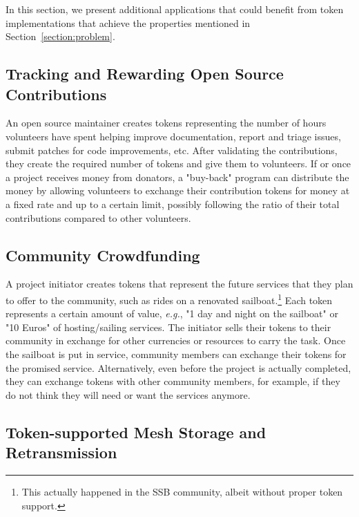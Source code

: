 \documentclass[sigconf,9pt]{acmart}
\begin{document}
In this section, we present additional applications that could benefit from token implementations that achieve the properties mentioned in Section~\ref{section:problem}.

\subsection{Tracking and Rewarding Open Source Contributions}
\label{section:tracking-oss-contributions}

An open source maintainer creates tokens representing the number of hours volunteers have spent helping improve documentation, report and triage issues, submit patches for code improvements, etc. After validating the contributions, they create the required number of tokens and give them to volunteers. If or once a project receives money from donators, a "buy-back" program can distribute the money by allowing volunteers to exchange their contribution tokens for money at a fixed rate and up to a certain limit, possibly following the ratio of their total contributions compared to other volunteers.

\subsection{Community Crowdfunding}
\label{section:community-crowdfunding}

A project initiator creates tokens that represent the future services that they plan to offer to the community, such as rides on a renovated sailboat.\footnote{This actually happened in the SSB community, albeit without proper token support.} Each token represents a certain amount of value,  \textit{e.g.}, "1 day and night on the sailboat" or "10 Euros" of hosting/sailing services. The initiator sells their tokens to their community in exchange for other currencies or resources to carry the task. Once the sailboat is put in service, community members can exchange their tokens for the promised service. Alternatively, even before the project is actually completed, they can exchange tokens with other community members, for example, if they do not think they will need or want the services anymore.

\subsection{Token-supported Mesh Storage and Retransmission}
\end{document}
